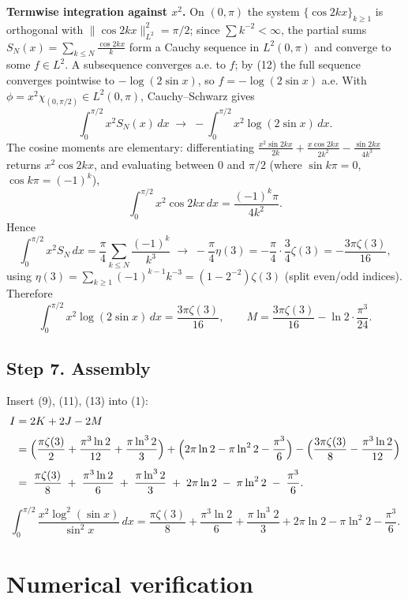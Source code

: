 \documentclass[11pt]{article}
\theoremstyle{remark}
\begin{document}
\textbf{Termwise integration against $x^{2}$.} On $(0,\pi)$ the system $\{\cos 2kx\}_{k\ge1}$ is orthogonal with $\|\cos 2kx\|_{L^{2}}^{2}=\pi/2$; since $\sum k^{-2}<\infty$, the partial sums $S_N(x)=\sum_{k\le N}\frac{\cos2kx}{k}$ form a Cauchy sequence in $L^{2}(0,\pi)$ and converge to some $f\in L^{2}$. A subsequence converges a.e. to $f$; by (12) the full sequence converges pointwise to $-\log(2\sin x)$, so $f=-\log(2\sin x)$ a.e. With $\phi=x^{2}\chi_{(0,\pi/2)}\in L^{2}(0,\pi)$, Cauchy--Schwarz gives
$$\int_0^{\pi/2}x^{2}S_N(x)\,dx\;\longrightarrow\;-\int_0^{\pi/2}x^{2}\log(2\sin x)\,dx .$$
The cosine moments are elementary: differentiating $\frac{x^{2}\sin 2kx}{2k}+\frac{x\cos 2kx}{2k^{2}}-\frac{\sin 2kx}{4k^{3}}$ returns $x^{2}\cos 2kx$, and evaluating between $0$ and $\pi/2$ (where $\sin k\pi=0$, $\cos k\pi=(-1)^{k}$),
$$\int_0^{\pi/2}x^{2}\cos 2kx\,dx=\frac{(-1)^{k}\pi}{4k^{2}} .$$
Hence
$$\int_0^{\pi/2}x^{2}S_N\,dx=\frac{\pi}{4}\sum_{k\le N}\frac{(-1)^{k}}{k^{3}}\;\longrightarrow\;
-\frac{\pi}{4}\eta(3)=-\frac{\pi}{4}\cdot\frac{3}{4}\zeta(3)=-\frac{3\pi\zeta(3)}{16},$$
using $\eta(3)=\sum_{k\ge1}(-1)^{k-1}k^{-3}=(1-2^{-2})\zeta(3)$ (split even/odd indices). Therefore
\begin{equation}\int_0^{\pi/2}x^{2}\log(2\sin x)\,dx=\frac{3\pi\zeta(3)}{16},
\qquad
M=\frac{3\pi\zeta(3)}{16}-\ln 2\cdot\frac{\pi^{3}}{24}. \tag{13}\end{equation}

\subsection*{Step 7. Assembly}

Insert (9), (11), (13) into (1):
$$\begin{aligned}
I&=2K+2J-2M\\[2pt]
&=\Bigl(\frac{\pi\zeta(3)}{2}+\frac{\pi^{3}\ln 2}{12}+\frac{\pi\ln^{3}2}{3}\Bigr)
+\Bigl(2\pi\ln 2-\pi\ln^{2}2-\frac{\pi^{3}}{6}\Bigr)
-\Bigl(\frac{3\pi\zeta(3)}{8}-\frac{\pi^{3}\ln 2}{12}\Bigr)\\[4pt]
&=\;\frac{\pi\zeta(3)}{8}\;+\;\frac{\pi^{3}\ln 2}{6}\;+\;\frac{\pi\ln^{3}2}{3}\;+\;2\pi\ln 2\;-\;\pi\ln^{2}2\;-\;\frac{\pi^{3}}{6}.
\end{aligned}$$

$$\int_0^{\pi/2}\frac{x^{2}\log^{2}(\sin x)}{\sin^{2}x}\,dx
=\frac{\pi\zeta(3)}{8}+\frac{\pi^{3}\ln 2}{6}+\frac{\pi\ln^{3}2}{3}+2\pi\ln 2-\pi\ln^{2}2-\frac{\pi^{3}}{6}.$$

\section*{Numerical verification}
\end{document}
